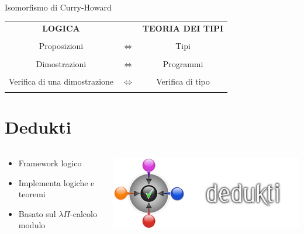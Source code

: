 \documentclass{beamer}
\begin{document}
\begin{frame}{Isomorfismo di Curry-Howard}
\begin{center}
  \begin{tabular}{ c  c  c }
    \textbf{\alert{LOGICA}} &  & \textbf{\alert{TEORIA DEI TIPI}} \\ \\
    Proposizioni & $\Leftrightarrow$ & Tipi \\ \\
    Dimostrazioni & $\Leftrightarrow$ & Programmi \\ \\
    Verifica di una dimostrazione & $\Leftrightarrow$ & Verifica di tipo \\ \\
  \end{tabular}
\end{center}
\end{frame}


\section{Dedukti}
\begin{frame}
\begin{columns}

\begin{column}{.5\textwidth}
\begin{itemize}
  \item Framework logico
  \vspace{1.5em}
  \item Implementa logiche e teoremi
  \vspace{1.5em}
  \item Basato sul $\lambda\Pi$-calcolo modulo
\end{itemize}
\end{column}

\begin{column}{.5\textwidth}
\includegraphics[scale=1]{dedukti2.png}
\end{column}
\end{columns}


\end{frame}
\end{document}
